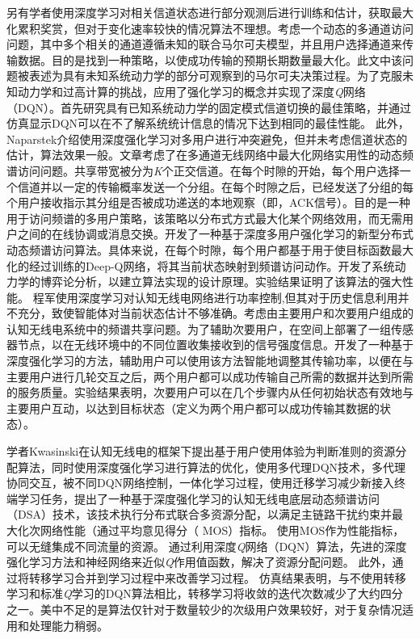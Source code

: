 另有学者使用深度学习对相关信道状态进行部分观测后进行训练和估计，获取最大化累积奖赏，但对于变化速率较快的情况算法不理想\cite{8303773}。考虑一个动态的多通道访问问题，其中多个相关的通道遵循未知的联合马尔可夫模型，并且用户选择通道来传输数据。目的是找到一种策略，以使成功传输的预期长期数量最大化。此文中该问题被表述为具有未知系统动力学的部分可观察到的马尔可夫决策过程。为了克服未知动力学和过高计算的挑战，应用了强化学习的概念并实现了深度\textit{Q}网络（DQN）。首先研究具有已知系统动力学的固定模式信道切换的最佳策略，并通过仿真显示DQN可以在不了解系统统计信息的情况下达到相同的最佳性能。
此外，Naparstek介绍使用深度强化学习对多用户进行冲突避免，但并未考虑信道状态的估计，算法效果一般\cite{8254101}。文章考虑了在多通道无线网络中最大化网络实用性的动态频谱访问问题。共享带宽被分为\textit{K}个正交信道。在每个时隙的开始，每个用户选择一个信道并以一定的传输概率发送一个分组。在每个时隙之后，已经发送了分组的每个用户接收指示其分组是否被成功递送的本地观察（即，ACK信号）。目的是一种用于访问频谱的多用户策略，该策略以分布式方式最大化某个网络效用，而无需用户之间的在线协调或消息交换。开发了一种基于深度多用户强化学习的新型分布式动态频谱访问算法。具体来说，在每个时隙，每个用户都基于用于使目标函数最大化的经过训练的Deep-Q网络，将其当前状态映射到频谱访问动作。开发了系统动力学的博弈论分析，以建立算法实现的设计原理。实验结果证明了该算法的强大性能。
程军使用深度学习对认知无线电网络进行功率控制,但其对于历史信息利用并不充分，致使智能体对当前状态估计不够准确\cite{Li2018Intelligent}。考虑由主要用户和次要用户组成的认知无线电系统中的频谱共享问题。为了辅助次要用户，在空间上部署了一组传感器节点，以在无线环境中的不同位置收集接收到的信号强度信息。开发了一种基于深度强化学习的方法，辅助用户可以使用该方法智能地调整其传输功率，以便在与主要用户进行几轮交互之后，两个用户都可以成功传输自己所需的数据并达到所需的服务质量。实验结果表明，次要用户可以在几个步骤内从任何初始状态有效地与主要用户互动，以达到目标状态（定义为两个用户都可以成功传输其数据的状态）。

学者Kwasinski在认知无线电的框架下提出基于用户使用体验为判断准则的资源分配算法，同时使用深度强化学习进行算法的优化，使用多代理DQN技术，多代理协同交互，被不同DQN网络控制，一体化学习过程，使用迁移学习减少新接入终端学习任务，提出了一种基于深度强化学习的认知无线电底层动态频谱访问（DSA）技术，该技术执行分布式联合多资源分配，以满足主链路干扰约束并最大化次网络性能（通过平均意见得分（ MOS）指标。 使用MOS作为性能指标，可以无缝集成不同流量的资源。 通过利用深度\textit{Q}网络（DQN）算法，先进的深度强化学习方法和神经网络来近似\textit{Q}作用值函数，解决了资源分配问题。 此外，通过将转移学习合并到学习过程中来改善学习过程。 仿真结果表明，与不使用转移学习和标准\textit{Q}学习的DQN算法相比，转移学习将收敛的迭代次数减少了大约四分之一。美中不足的是算法仅针对于数量较少的次级用户效果较好，对于复杂情况适用和处理能力稍弱\cite{8403658}。

